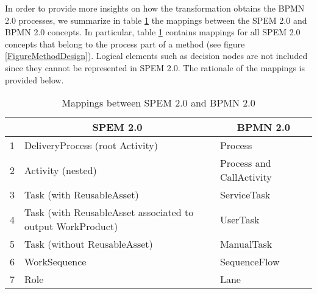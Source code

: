 \documentclass[runningheads,a4paper]{llncs}
\begin{document}
In order to provide more insights on how the transformation obtains the
BPMN 2.0 processes, we summarize in table \ref{tableMappings} the mappings
between the SPEM 2.0 and BPMN 2.0 concepts. In particular, table
\ref{tableMappings} contains mappings for all SPEM 2.0 concepts that belong to
the process part of a method (see figure \ref{FigureMethodDesign}). Logical
elements such as decision nodes are not included since they cannot be
represented in SPEM 2.0. The rationale of the mappings is provided below.

\begin{table}
\caption{Mappings between SPEM 2.0 and BPMN 2.0}
\centering
\begin{tabular}{| p{0.5cm} | p{5.5cm} | p{5.5cm} |}
\cline{2-3}
\multicolumn{1}{c|}{} & \multicolumn{1}{|c|}{\textbf{SPEM 2.0}} &
\multicolumn{1}{|c|}{\textbf{BPMN 2.0}}
\\
\hline
1 & DeliveryProcess (root Activity) & Process\\
\hline
2 & Activity (nested) & Process and CallActivity\\
\hline
3 & Task (with ReusableAsset) & ServiceTask\\
\hline
4 & Task (with ReusableAsset associated to output WorkProduct) &
UserTask\\
\hline
5 & Task (without ReusableAsset) & ManualTask\\
\hline
6 & WorkSequence & SequenceFlow\\
\hline
7 & Role & Lane \\
\hline
\end{tabular}
\label{tableMappings}
\end{table}
\end{document}
